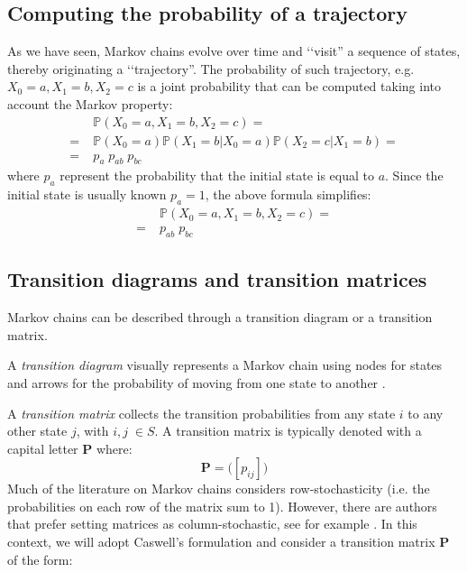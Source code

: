 \subsection{Computing the probability of a trajectory}

\noindent As we have seen, Markov chains evolve over time and \lq\lq visit'' a sequence of states, thereby originating a \lq\lq trajectory''. The probability of such trajectory, e.g. $X_0 = a, X_1 = b, X_2 = c$ is a joint probability that can be computed taking into account the Markov property:
\begin{equation}
\begin{split}
   &\mathds{P}(X_0 = a, X_1 = b, X_2 = c) =\\
   =\;  &\mathds{P}(X_0 = a) \mathds{P}(X_1 = b |X_0 = a ) \mathds{P}(X_2 = c |X_1 = b ) = \\
   =\; &p_a \; p_{ab}\; p_{bc}
\end{split}
\end{equation}
where $p_a$ represent the probability that the initial state is equal to $a$. Since the initial state is usually known $p_a = 1$, the above formula simplifies:
\begin{equation}
\begin{split}
   &\mathds{P}(X_0 = a, X_1 = b, X_2 = c) =\\
   =\; &p_{ab}\; p_{bc}
\end{split}
\end{equation}










\subsection{Transition diagrams and transition matrices}

Markov chains can be described through a transition diagram or a transition matrix.

A \textit{transition diagram} visually represents a Markov chain using nodes for states and arrows for the probability of moving from one state to another \citep{Gagniuc2017}. 

A \textit{transition matrix} collects the transition probabilities from any state $i$ to any other state $j$, with $i,j \; \in S$. A transition matrix is typically denoted with a capital letter $\mathbf{P}$ where:
\begin{equation}
    \mathbf{P} = \Big( [p_{ij}] \Big)
\end{equation}
Much of the literature on Markov chains considers row-stochasticity (i.e. the probabilities on each row of the matrix sum to 1). However, there are authors that prefer setting matrices as column-stochastic, see for example \cite{Caswell2006}. In this context, we will adopt Caswell's formulation and consider a transition matrix $\mathbf{P}$ of the form:

